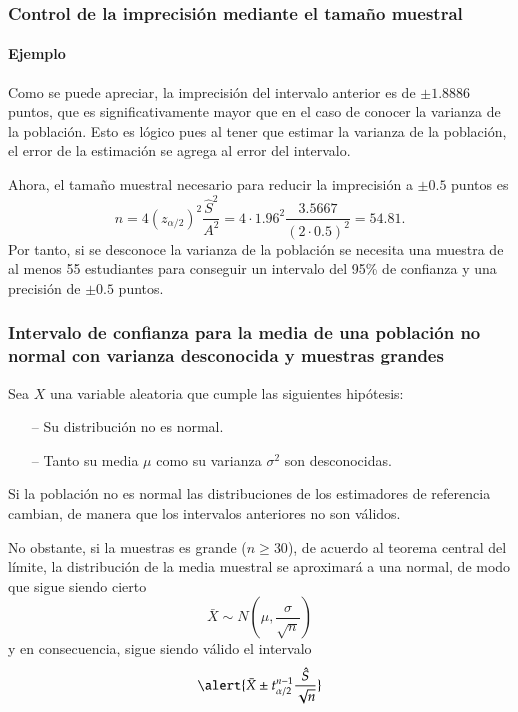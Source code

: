 \begin{frame}
\frametitle{Control de la imprecisión mediante el tamaño muestral}
\framesubtitle{Ejemplo}
Como se puede apreciar, la imprecisión del intervalo anterior es de $\pm 1.8886$ puntos, que es significativamente mayor que en el caso de
conocer la varianza de la población. Esto es lógico pues al tener que estimar la varianza de la población, el error de la estimación se agrega al error del intervalo.

Ahora, el tamaño muestral necesario para reducir la imprecisión a $\pm 0.5$ puntos es
\[
n = 4 (z_{\alpha/2})^2\frac{\hat{S}^2}{A^2} = 4\cdot 1.96^2\frac{3.5667}{(2\cdot 0.5)^2} = 54.81.
\]
Por tanto, si se desconoce la varianza de la población se necesita una muestra de al menos 55 estudiantes para conseguir un
intervalo del 95\% de confianza y una precisión de $\pm 0.5$ puntos.
\end{frame}


\begin{frame}
\frametitle{Intervalo de confianza para la media de una población no normal con varianza desconocida y muestras grandes}
Sea $X$ una variable aleatoria que cumple las siguientes hipótesis:
\begin{itemize}
\item[--] Su distribución no es normal.
\item[--] Tanto su media $\mu$ como su varianza $\sigma^2$ son desconocidas.
\end{itemize}

Si la población no es normal las distribuciones de los estimadores de referencia cambian, de manera que los intervalos anteriores no son válidos.

No obstante, si la muestras es grande ($n\geq 30$), de acuerdo al teorema central del límite, la distribución de la media muestral se aproximará a una normal, de modo que sigue siendo cierto 
\[
\bar X \sim N\left(\mu,\frac{\sigma}{\sqrt{n}}\right)
\]
y en consecuencia, sigue siendo válido el intervalo 
\[
\alert{\bar{X}\pm t^{n-1}_{\alpha/2}\frac{\hat{S}}{\sqrt{n}}}
\]
\end{frame}


